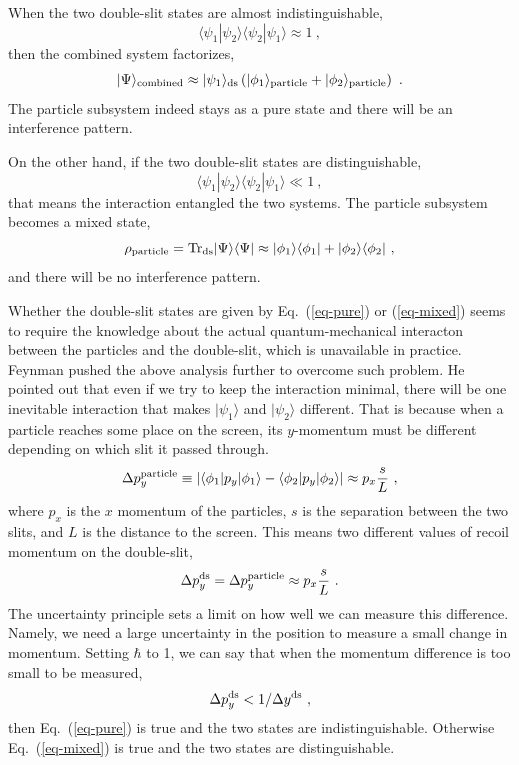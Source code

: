 \documentclass[aps,showpacs,twocolumn,floats,prd,superscriptaddress,nofootinbib]{revtex4-1}
\begin{document}
When the two double-slit states are almost indistinguishable,
\begin{equation}
\langle\psi_1|\psi_2\rangle\langle\psi_2|\psi_1\rangle \approx 1~,
\label{eq-pure}
\end{equation}
then the combined system factorizes,
\begin{equation}
|\Psi\rangle_{\rm combined} \approx |\psi_1\rangle_{\rm ds}
\left(|\phi_1\rangle_{\rm particle} + |\phi_2\rangle_{\rm particle}\right) ~.
\end{equation}
The particle subsystem indeed stays as a pure state and there will be an interference pattern.

On the other hand, if the two double-slit states are distinguishable,
\begin{equation}
\langle\psi_1|\psi_2\rangle\langle\psi_2|\psi_1\rangle \ll 1~,
\label{eq-mixed}
\end{equation}
that means the interaction entangled the two systems. The particle subsystem becomes a mixed state,
\begin{equation}
\rho_{\rm particle} = {\rm Tr}_{\rm ds}|\Psi\rangle\langle\Psi| \approx
|\phi_1\rangle\langle\phi_1| + |\phi_2\rangle\langle\phi_2|~,
\end{equation}
and there will be no interference pattern.

Whether the double-slit states are given by Eq.~(\ref{eq-pure}) or (\ref{eq-mixed}) seems to require the knowledge about the actual quantum-mechanical interacton between the particles and the double-slit, which is unavailable in practice.
Feynman pushed the above analysis further to overcome such problem.
He pointed out that even if we try to keep the interaction minimal, there will be one inevitable interaction that makes $|\psi_1\rangle$ and $|\psi_2\rangle$ different.
That is because when a particle reaches some place on the screen, its $y$-momentum must be different depending on which slit it passed through.
\begin{equation}
\Delta p_y^{\rm particle} \equiv 
|\langle\phi_1|p_y|\phi_1\rangle - \langle\phi_2|p_y|\phi_2\rangle| 
\approx p_x \frac{s}{L}~,
\end{equation}
where $p_x$ is the $x$ momentum of the particles, $s$ is the separation between the two slits, and $L$ is the distance to the screen. 
This means two different values of recoil momentum on the double-slit,
\begin{equation}
\Delta p_y^{\rm ds} = \Delta p_y^{\rm particle} \approx p_x \frac{s}{L}~.
\label{eq-dpds}
\end{equation}
The uncertainty principle sets a limit on how well we can measure this difference. Namely, we need a large uncertainty in the position to measure a small change in momentum. Setting $\hbar$ to 1, we can say that when the momentum difference is too small to be measured,
\begin{equation}
\Delta p_y^{\rm ds} < 1/\Delta y^{\rm ds}~,
\label{eq-standard}
\end{equation} 
then Eq.~(\ref{eq-pure}) is true and the two states are indistinguishable. 
Otherwise Eq.~(\ref{eq-mixed}) is true and the two states are distinguishable.
\end{document}
